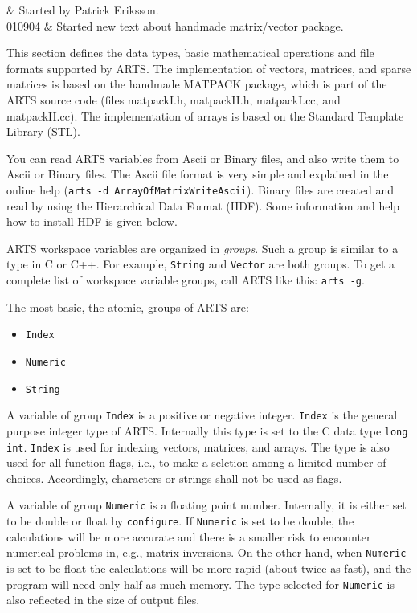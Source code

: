 
 \label{sec:formats}
 
 & Started by Patrick Eriksson. \\
  010904 & Started new text about handmade matrix/vector package.\\
\stophistory

This section defines the data types, basic mathematical operations
and file formats supported by ARTS. The implementation of vectors,
matrices, and sparse matrices is based on the handmade MATPACK
package, which is part of the ARTS source code (files matpackI.h,
matpackII.h, matpackI.cc, and matpackII.cc). The implementation of
arrays is based on the Standard Template Library (STL).

You can read ARTS variables from Ascii or Binary files, and also
write them to Ascii or Binary files. The Ascii file format is very
simple and explained in the online help %
(\verb|arts -d ArrayOfMatrixWriteAscii|).  Binary files are created
and read by using the Hierarchical Data Format (HDF). Some
information and help how to install HDF is given below.

ARTS workspace variables are organized in \emph{groups}. Such a group
is similar to a type in C or C++. For example, \verb|String| and
\verb|Vector| are both groups. To get a complete list of workspace
variable groups, call ARTS like this: \verb|arts -g|.

 \label{sec:formats:datatypes}

\label{sec:formats:atomic}
 
The most basic, the atomic, groups of ARTS are:

\begin{itemize}
\item \verb|Index|
\item \verb|Numeric|
\item \verb|String|
\end{itemize}

A variable of group \verb|Index| is a positive or negative integer.
\verb|Index| is the general purpose integer type of ARTS.  Internally
this type is set to the C data type \verb|long int|. \verb|Index| is
used for indexing vectors, matrices, and arrays. The type is also used
for all function flags, i.e., to make a selction among a limited number
of choices. Accordingly, characters or strings shall not be used as
flags.

A variable of group \verb|Numeric| is a floating point number.
Internally, it is either set to be double or float by
\verb|configure|. If \verb|Numeric| is set to be double, the
calculations will be more accurate and there is a smaller risk to
encounter numerical problems in, e.g., matrix inversions.  On the
other hand, when \verb|Numeric| is set to be float the calculations
will be more rapid (about twice as fast), and the program will need
only half as much memory. The type selected for \verb|Numeric| is also
reflected in the size of output files.

